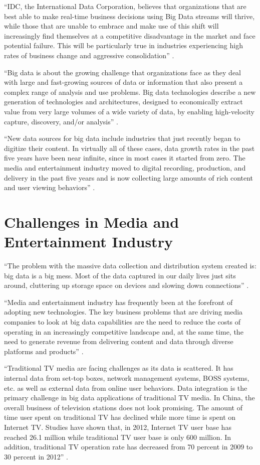 \documentclass[sigconf]{acmart}
\begin{document}
``IDC, the International Data Corporation, believes that organizations that are best able to make real-time business decisions using Big Data streams will thrive, while those that are unable to embrace and make use of this shift will increasingly find themselves at a competitive disadvantage in the market and face potential failure. This will be particularly true in industries experiencing high rates of business change and aggressive consolidation'' \cite{Villars2011care}.

``Big data is about the growing challenge that organizations face as they deal with large and fast-growing sources of data or information that also present a complex range of analysis and use problems. Big data technologies describe a new generation of technologies and architectures, designed to economically extract value from very large volumes of a wide variety of data, by enabling high-velocity capture, discovery, and/or analysis'' \cite{Villars2011care}. 

``New data sources for big data include industries that just recently began to digitize their content. In virtually all of these cases, data growth rates in the past five years have been near infinite, since in most cases it started from zero. The media and entertainment industry moved to digital recording, production, and delivery in the past five years and is now collecting large amounts of rich content and user viewing behaviors'' \cite{Villars2011care}.

\section{Challenges in Media and Entertainment Industry}

``The problem with the massive data collection and distribution system created is: big data is a big mess. Most of the data captured in our daily lives just sits around, cluttering up storage space on devices and slowing down connections'' \cite{Schlieski2012data}.

``Media and entertainment industry has frequently been at the forefront of adopting new technologies. The key business problems that are driving media companies to look at big data capabilities are the need to reduce the costs of operating in an increasingly competitive landscape and, at the same time, the need to generate revenue from delivering content and data through diverse platforms and products'' \cite{Lippell2016sectors}.

``Traditional TV media are facing challenges as its data is scattered. It has internal data from set-top boxes, network management systems, BOSS systems, etc. as well as external data from online user behaviors. Data integration is the primary challenge in big data applications of traditional TV media. In China, the overall business of television stations does not look promising. The amount of time user spent on traditional TV has declined while more time is spent on Internet TV. Studies have shown that, in 2012, Internet TV user base has reached 26.1 million while traditional TV user base is only 600 million. In addition, traditional TV operation rate has decreased from 70 percent in 2009 to 30 percent in 2012'' \cite{Zhang2017era}. 
\end{document}
